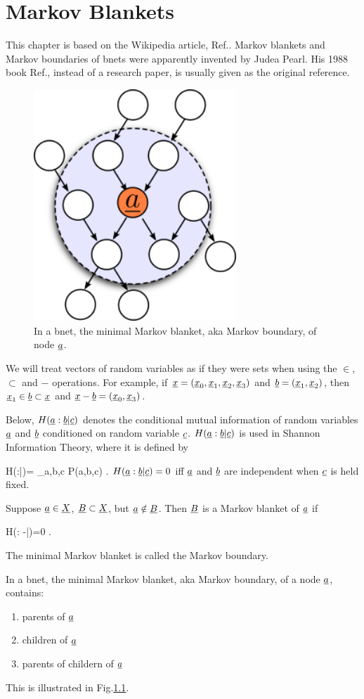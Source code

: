 \chapter{Markov Blankets}


This chapter is based on the
Wikipedia article, 
Ref.\cite{wiki-mblanket}.
Markov blankets
and Markov boundaries of bnets
were apparently invented
by Judea Pearl. His 1988 book
 Ref.\cite{Pearl-mblanket}, 
instead of a research paper, is 
usually given as the original reference.

\begin{figure}[h!]
\centering
\includegraphics[width=3in]{mblanket/mblanket.png}
\caption{In a bnet,
the minimal Markov blanket,
aka Markov boundary,
of node ${\underline{a}}$.} 
\label{fig-mblanket}
\end{figure}

We will treat vectors 
of random variables as if
they were sets when using the $\in$,
$\subset$ and $-$ operations.
For example,
if ${\underline{x}}=({\underline{x}}_0, 
{\underline{x}}_1, {\underline{x}}_2,
{\underline{x}}_3)$ and
${\underline{b}}=({\underline{x}}_1, {\underline{x}}_2)$,
then ${\underline{x}}_1\in {\underline{b}}\subset {\underline{x}}$ and
${\underline{x}}-{\underline{b}}=({\underline{x}}_0, {\underline{x}}_3)$.

Below, $H({\underline{a}}:{\underline{b}}|{\underline{c}})$
denotes the conditional
mutual information of
random variables
${\underline{a}}$ and ${\underline{b}}$
conditioned on 
random variable ${\underline{c}}$.
$H({\underline{a}}:{\underline{b}}|{\underline{c}})$
is used in Shannon Information
Theory, where it is defined by

\beq
H(\rva:\rvb|\rvc)=
\sum_{a,b,c}
P(a,b,c)\ln 
{}
\;.
\eeq
$H({\underline{a}}:{\underline{b}}|{\underline{c}})=0$
iff ${\underline{a}}$ and ${\underline{b}}$
are independent
when ${\underline{c}}$ is held fixed.



Suppose
${\underline{a}}\in  {\underline{X}}$,
 ${\underline{B}}\subset {\underline{X}}$,
but ${\underline{a}}\notin{\underline{B}}$.
Then ${\underline{B}}$ is a Markov blanket
of ${\underline{a}}$ if

\beq
H(\rva: \rvX-\rva|\rvB)=0
\;.
\eeq

The minimal Markov blanket 
is called the Markov boundary.

In a bnet, the minimal Markov blanket,
aka Markov boundary,
of a node ${\underline{a}}$,
contains:
\begin{enumerate}
\item
parents of ${\underline{a}}$
\item
children of ${\underline{a}}$
\item
parents of childern of ${\underline{a}}$
\end{enumerate}
This is illustrated in 
Fig.\ref{fig-mblanket}.
